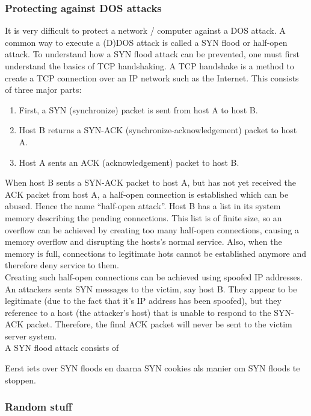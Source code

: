 \subsubsection{Protecting against DOS attacks}

It is very difficult to protect a network / computer against a DOS attack. A common way to execute a (D)DOS attack is called a SYN flood or half-open attack. To understand how a SYN flood attack can be prevented, one must first understand the basics of TCP handshaking. A TCP handshake is a method to create a TCP connection over an IP network such as the Internet. This consists of three major parts:
\begin{enumerate}
\item First, a SYN (synchronize) packet is sent from host A to host B.
\item Host B returns a SYN-ACK (synchronize-acknowledgement) packet to host A.
\item Host A sents an ACK (acknowledgement) packet to host B.
\end{enumerate}
When host B sents a SYN-ACK packet to host A, but has not yet received the ACK packet from host A, a half-open connection is established which can be abused. Hence the name ``half-open attack''. Host B has a list in its system memory describing the pending connections. This list is of finite size, so an overflow can be achieved by creating too many half-open connections, causing a memory overflow and disrupting the hosts's normal service. Also, when the memory is full, connections to legitimate hots cannot be established anymore and therefore deny service to them. \\
Creating such half-open connections can be achieved using spoofed IP addresses. An attackers sents SYN messages to the victim, say host B. They appear to be legitimate (due to the fact that it's IP address has been spoofed), but they reference to a host (the attacker's host) that is unable to respond to the SYN-ACK packet. Therefore, the final ACK packet will never be sent to the victim server system. \\



A SYN flood attack consists of 

Eerst iets over SYN floods en daarna SYN cookies als manier om SYN floods te stoppen.

\clearpage

\subsubsection{Random stuff}

